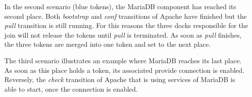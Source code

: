 In the second scenario (blue tokens), the MariaDB component has reached
its second place. Both \emph{bootstrap} and \emph{conf} transitions of Apache
have finished but the \emph{pull} transition is still running. For this
reasons the three docks responsible for the join will not release the
tokens until \emph{pull} is terminated. As soon as \emph{pull}
finishes, the three tokens are merged into one token and set to the
next place.%

The third scenario illustrates an example where MariaDB reaches
its last place. As soon as this place holds a token, its associated
provide connection is enabled. Reversely, the \emph{check}
transition of Apache that is using services of MariaDB is able to
start, once the connection is enabled.